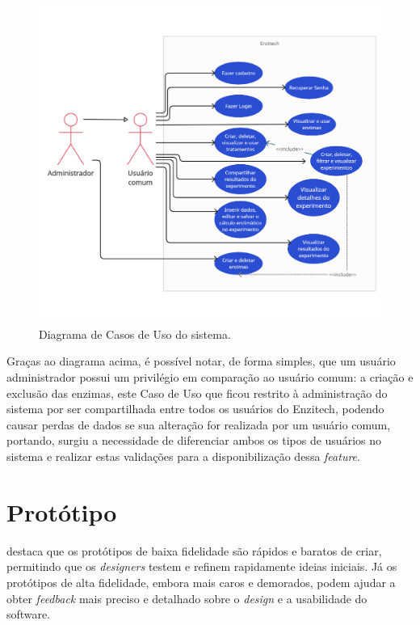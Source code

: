 \begin{figure}[H]
\centering
  \includegraphics[width=\columnwidth]{images/use-cases-enzitech.png}
  \caption{Diagrama de Casos de Uso do sistema.}
  \label{fig:use-cases-enzitech}
\end{figure}

Graças ao diagrama acima, é possível notar, de forma simples, que um usuário administrador possui um privilégio em comparação ao usuário comum: a criação e exclusão das enzimas, este Caso de Uso que ficou restrito à administração do sistema por ser compartilhada entre todos os usuários do Enzitech, podendo causar perdas de dados se sua alteração for realizada por um usuário comum, portando, surgiu a necessidade de diferenciar ambos os tipos de usuários no sistema e realizar estas validações para a disponibilização dessa \textit{feature}. 

\section{Protótipo}
\cite{warfel2009prototyping} destaca que os protótipos de baixa fidelidade são rápidos e baratos de criar, permitindo que os \textit{designers} testem e refinem rapidamente ideias iniciais. Já os protótipos de alta fidelidade, embora mais caros e demorados, podem ajudar a obter \textit{feedback} mais preciso e detalhado sobre o \textit{design} e a usabilidade do software.


